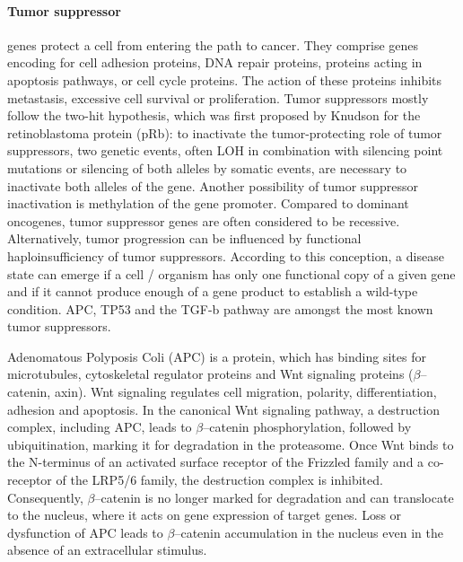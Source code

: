 {{{      \paragraph{Tumor suppressor} genes protect a cell from entering the path
      to cancer. They comprise genes encoding for cell adhesion proteins,  DNA
      repair proteins, proteins acting in apoptosis pathways, or cell cycle
      proteins. The action of these proteins inhibits metastasis, excessive cell
      survival or proliferation. Tumor suppressors mostly follow the two-hit
      hypothesis, which was first proposed by Knudson  for the retinoblastoma
      protein (pRb): to inactivate the tumor-protecting role of tumor
      suppressors, two genetic events, often LOH in  combination with silencing
      point mutations or silencing of both alleles by somatic events, are
      necessary to inactivate both alleles of the gene. Another possibility of
      tumor suppressor inactivation is methylation of the gene promoter.
      Compared to dominant oncogenes, tumor suppressor genes are often
      considered to be recessive. Alternatively, tumor progression can be
      influenced by functional haploinsufficiency of tumor suppressors.
      According to this conception, a disease state can emerge if a cell /
      organism has only one functional copy of a given gene and if it cannot
      produce enough of a gene product to establish a wild-type condition. APC,
      TP53 and the TGF-b pathway are amongst the most known tumor suppressors.

      Adenomatous Polyposis Coli (APC) is a protein, which has binding sites for
      microtubules, cytoskeletal regulator proteins and Wnt signaling proteins
      ($\beta$--catenin, axin). Wnt signaling regulates cell migration,
      polarity, differentiation, adhesion and apoptosis. In the canonical Wnt
      signaling pathway, a destruction complex, including APC, leads to
      $\beta$--catenin phosphorylation, followed by ubiquitination, marking it
      for degradation in the proteasome. Once Wnt binds to the N-terminus of an
      activated surface receptor of the Frizzled family and a
      co-receptor of the LRP5/6 family, the destruction complex is inhibited.
      Consequently, $\beta$--catenin is no longer marked for degradation and can
      translocate to the nucleus, where it acts on gene
      expression of target genes. Loss or dysfunction of APC leads to
      $\beta$--catenin accumulation in the nucleus even in the absence of  an
      extracellular stimulus.

}}}
